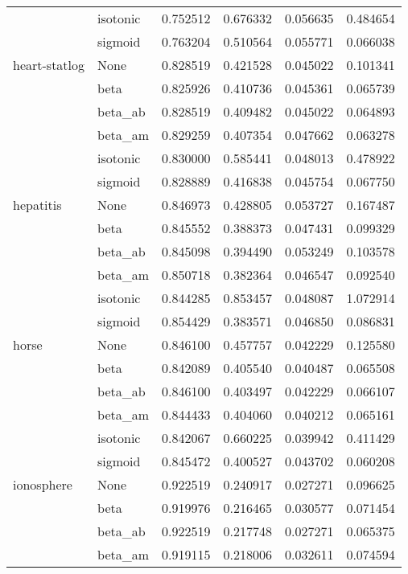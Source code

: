 \begin{tabular}{llrrrr}
        & isotonic &  0.752512 &  0.676332 &  0.056635 &  0.484654 \\
        & sigmoid &  0.763204 &  0.510564 &  0.055771 &  0.066038 \\
heart-statlog & None &  0.828519 &  0.421528 &  0.045022 &  0.101341 \\
        & beta &  0.825926 &  0.410736 &  0.045361 &  0.065739 \\
        & beta\_ab &  0.828519 &  0.409482 &  0.045022 &  0.064893 \\
        & beta\_am &  0.829259 &  0.407354 &  0.047662 &  0.063278 \\
        & isotonic &  0.830000 &  0.585441 &  0.048013 &  0.478922 \\
        & sigmoid &  0.828889 &  0.416838 &  0.045754 &  0.067750 \\
hepatitis & None &  0.846973 &  0.428805 &  0.053727 &  0.167487 \\
        & beta &  0.845552 &  0.388373 &  0.047431 &  0.099329 \\
        & beta\_ab &  0.845098 &  0.394490 &  0.053249 &  0.103578 \\
        & beta\_am &  0.850718 &  0.382364 &  0.046547 &  0.092540 \\
        & isotonic &  0.844285 &  0.853457 &  0.048087 &  1.072914 \\
        & sigmoid &  0.854429 &  0.383571 &  0.046850 &  0.086831 \\
horse & None &  0.846100 &  0.457757 &  0.042229 &  0.125580 \\
        & beta &  0.842089 &  0.405540 &  0.040487 &  0.065508 \\
        & beta\_ab &  0.846100 &  0.403497 &  0.042229 &  0.066107 \\
        & beta\_am &  0.844433 &  0.404060 &  0.040212 &  0.065161 \\
        & isotonic &  0.842067 &  0.660225 &  0.039942 &  0.411429 \\
        & sigmoid &  0.845472 &  0.400527 &  0.043702 &  0.060208 \\
ionosphere & None &  0.922519 &  0.240917 &  0.027271 &  0.096625 \\
        & beta &  0.919976 &  0.216465 &  0.030577 &  0.071454 \\
        & beta\_ab &  0.922519 &  0.217748 &  0.027271 &  0.065375 \\
        & beta\_am &  0.919115 &  0.218006 &  0.032611 &  0.074594 \\

\end{tabular}

